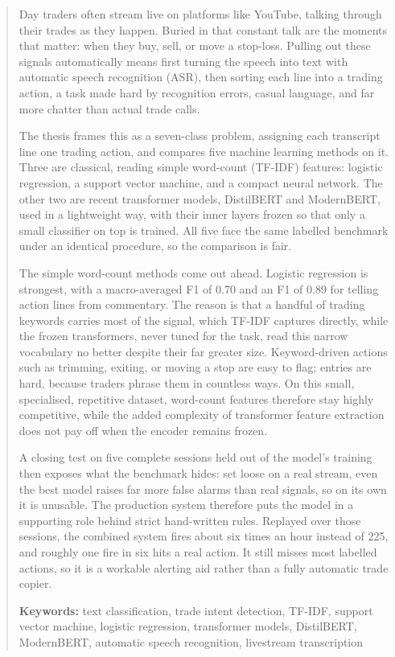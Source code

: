 \documentclass[a4paper, 12pt, oneside]{article}
\begin{document}
\begin{abstract}

Day traders often stream live on platforms like YouTube, talking through their trades as they happen. Buried in that constant talk are the moments that matter: when they buy, sell, or move a stop-loss. Pulling out these signals automatically means first turning the speech into text with automatic speech recognition (ASR), then sorting each line into a trading action, a task made hard by recognition errors, casual language, and far more chatter than actual trade calls.

The thesis frames this as a seven-class problem, assigning each transcript line one trading action, and compares five machine learning methods on it. Three are classical, reading simple word-count (TF-IDF) features: logistic regression, a support vector machine, and a compact neural network. The other two are recent transformer models, DistilBERT and ModernBERT, used in a lightweight way, with their inner layers frozen so that only a small classifier on top is trained. All five face the same labelled benchmark under an identical procedure, so the comparison is fair.

The simple word-count methods come out ahead. Logistic regression is strongest, with a macro-averaged F1 of 0.70 and an F1 of 0.89 for telling action lines from commentary. The reason is that a handful of trading keywords carries most of the signal, which TF-IDF captures directly, while the frozen transformers, never tuned for the task, read this narrow vocabulary no better despite their far greater size. Keyword-driven actions such as trimming, exiting, or moving a stop are easy to flag; entries are hard, because traders phrase them in countless ways. On this small, specialised, repetitive dataset, word-count features therefore stay highly competitive, while the added complexity of transformer feature extraction does not pay off when the encoder remains frozen.

A closing test on five complete sessions held out of the model's training then exposes what the benchmark hides: set loose on a real stream, even the best model raises far more false alarms than real signals, so on its own it is unusable. The production system therefore puts the model in a supporting role behind strict hand-written rules. Replayed over those sessions, the combined system fires about six times an hour instead of 225, and roughly one fire in six hits a real action. It still misses most labelled actions, so it is a workable alerting aid rather than a fully automatic trade copier.

\medskip
\noindent\textbf{Keywords:} text classification, trade intent detection, TF-IDF, support vector machine, logistic regression, transformer models, DistilBERT, ModernBERT, automatic speech recognition, livestream transcription
\end{abstract}

\pagebreak






\end{document}
